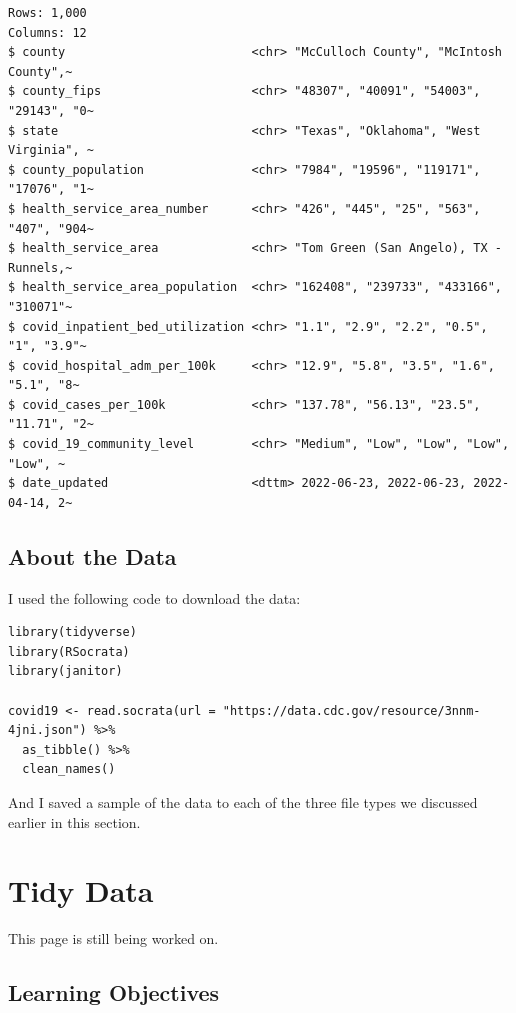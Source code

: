 \documentclass[
  letterpaper,
  DIV=11,
  numbers=noendperiod]{scrreprt}
\begin{document}
\begin{verbatim}
Rows: 1,000
Columns: 12
$ county                          <chr> "McCulloch County", "McIntosh County",~
$ county_fips                     <chr> "48307", "40091", "54003", "29143", "0~
$ state                           <chr> "Texas", "Oklahoma", "West Virginia", ~
$ county_population               <chr> "7984", "19596", "119171", "17076", "1~
$ health_service_area_number      <chr> "426", "445", "25", "563", "407", "904~
$ health_service_area             <chr> "Tom Green (San Angelo), TX - Runnels,~
$ health_service_area_population  <chr> "162408", "239733", "433166", "310071"~
$ covid_inpatient_bed_utilization <chr> "1.1", "2.9", "2.2", "0.5", "1", "3.9"~
$ covid_hospital_adm_per_100k     <chr> "12.9", "5.8", "3.5", "1.6", "5.1", "8~
$ covid_cases_per_100k            <chr> "137.78", "56.13", "23.5", "11.71", "2~
$ covid_19_community_level        <chr> "Medium", "Low", "Low", "Low", "Low", ~
$ date_updated                    <dttm> 2022-06-23, 2022-06-23, 2022-04-14, 2~
\end{verbatim}

\hypertarget{about-the-data}{%
\section{About the Data}\label{about-the-data}}

I used the following code to download the data:

\begin{verbatim}
library(tidyverse)
library(RSocrata)
library(janitor)

covid19 <- read.socrata(url = "https://data.cdc.gov/resource/3nnm-4jni.json") %>%
  as_tibble() %>%
  clean_names()
\end{verbatim}

And I saved a sample of the data to each of the three file types we
discussed earlier in this section.


\hypertarget{tidy-data}{%
\chapter{Tidy Data}\label{tidy-data}}

This page is still being worked on.

\hypertarget{learning-objectives-5}{%
\section{Learning Objectives}\label{learning-objectives-5}}
\end{document}
